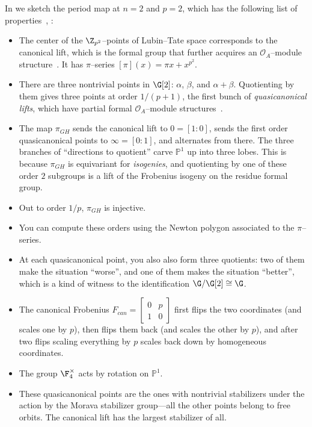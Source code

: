 \begin{remark}
In  we sketch the period map at \(n = 2\) and \(p = 2\), which has the following list of properties~\cite[Appendix 25]{HopkinsGrossEquivVBs}, \cite{Yu}:
\begin{itemize}
\item The center of the \(\Z_{p^2}\)--points of Lubin--Tate space corresponds to the canonical lift, which is the formal group that further acquires an \(\mathcal O_A\)--module structure~\cite{LubinTateOther}.  It has \(\pi\)--series \([\pi](x) = \pi x + x^{p^2}\).
\item There are three nontrivial points in \(\G[2]\): \(\alpha\), \(\beta\), and \(\alpha + \beta\).  Quotienting by them gives three points at order \(1/(p+1)\), the first bunch of \textit{quasicanonical lifts}, which have partial formal \(\mathcal O_A\)--module structures~\cite{Gross}.
\item The map \(\pi_{GH}\) sends the canonical lift to \(0 = [1:0]\), sends the first order quasicanonical points to \(\infty = [0:1]\), and alternates from there.  The three branches of ``directions to quotient'' carve \(\mathbb P^1\) up into three lobes.  This is because \(\pi_{GH}\) is equivariant for \textit{isogenies}, and quotienting by one of these order \(2\) subgroups is a lift of the Frobenius isogeny on the residue formal group.
\item Out to order \(1/p\), \(\pi_{GH}\) is injective.
\item You can compute these orders using the Newton polygon associated to the \(\pi\)--series.
\item At each quasicanonical point, you also also form three quotients: two of them make the situation ``worse'', and one of them makes the situation ``better'', which is a kind of witness to the identification \(\G / \G[2] \cong \G\).
\item The canonical Frobenius \(F_{can} = \left[ \begin{array}{cc} 0 & p \\ 1 & 0 \end{array} \right]\) first flips the two coordinates (and scales one by \(p\)), then flips them back (and scales the other by \(p\)), and after two flips scaling everything by \(p\) scales back down by homogeneous coordinates.
\item The group \(\F_4^\times\) acts by rotation on \(\mathbb P^1\).
\item These quasicanonical points are the ones with nontrivial stabilizers under the action by the Morava stabilizer group---all the other points belong to free orbits.  The canonical lift has the largest stabilizer of all.
\end{itemize}
\end{remark}

